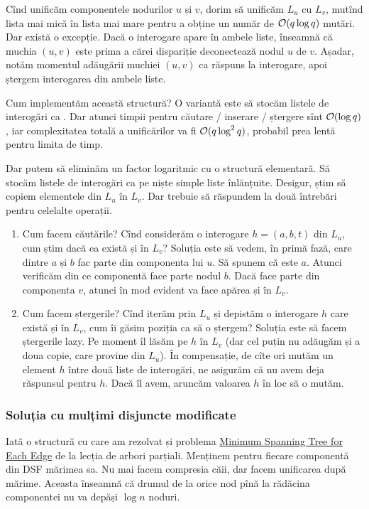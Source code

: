 \documentclass[../main.tex]{subfiles}
\begin{document}
Cînd unificăm componentele nodurilor $u$ și $v$, dorim să unificăm $L_u$ cu $L_v$, mutînd lista mai mică în lista mai mare pentru a obține un număr de $\mathcal{O}(q \log q)$ mutări. Dar există o excepție. Dacă o interogare apare în ambele liste, înseamnă că muchia $(u,v)$ este prima a cărei dispariție deconectează nodul $u$ de $v$. Așadar, notăm momentul adăugării muchiei $(u,v)$ ca răspuns la interogare, apoi ștergem interogarea din ambele liste.

Cum implementăm această structură? O variantă este să stocăm listele de interogări ca . Dar atunci timpii pentru căutare / inserare / ștergere sînt $\mathcal{O}(\log q)$, iar complexitatea totală a unificărilor va fi $\mathcal{O}(q \log^2 q)$, probabil prea lentă pentru limita de timp.

Dar putem să eliminăm un factor logaritmic cu o structură elementară. Să stocăm listele de interogări ca pe niște simple liste înlănțuite. Desigur, știm să copiem elementele din $L_u$ în $L_v$. Dar trebuie să răspundem la două întrebări pentru celelalte operații.

\begin{enumerate}
  \item Cum facem căutările? Cînd considerăm o interogare $h = (a, b, t)$ din $L_u$, cum știm dacă ea există și în $L_v$? Soluția este să vedem, în primă fază, care dintre $a$ și $b$ fac parte din componenta lui $u$. Să spunem că este $a$. Atunci verificăm din ce componentă face parte nodul $b$. Dacă face parte din componenta $v$, atunci în mod evident va face apărea și în $L_v$.

  \item Cum facem ștergerile? Cînd iterăm prin $L_u$ și depistăm o interogare $h$ care există și în $L_v$, cum îi găsim poziția ca să o ștergem? Soluția este să facem ștergerile lazy. Pe moment îl lăsăm pe $h$ în $L_v$ (dar cel puțin nu adăugăm și a doua copie, care provine din $L_u$). În compensație, de cîte ori mutăm un element $h$ între două liste de interogări, ne asigurăm că nu avem deja răspunsul pentru $h$. Dacă îl avem, aruncăm valoarea $h$ în loc să o mutăm.
\end{enumerate}

\subsubsection*{Soluția cu mulțimi disjuncte modificate}

Iată o structură cu care am rezolvat și problema \hyperref[problem:mst-for-each-edge]{Minimum Spanning Tree for Each Edge} de la lecția de arbori parțiali. Menținem pentru fiecare componentă din DSF mărimea sa. Nu mai facem compresia căii, dar facem unificarea după mărime. Aceasta înseamnă că drumul de la orice nod pînă la rădăcina componentei nu va depăși $\log n$ noduri.
\end{document}
